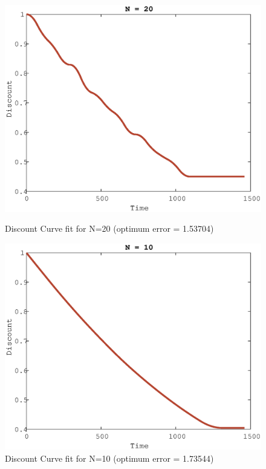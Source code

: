 \documentclass[a4paper]{article}
\begin{document}
\begin{figure}[!ht]
  \centering
  \begin{minipage}[b]{0.4\textwidth}
    \includegraphics[width=1.0\textwidth]{N20.eps}
    \caption{Discount Curve fit for N=20 (optimum error = 1.53704)}
  \end{minipage}
  \hfill
  \begin{minipage}[b]{0.4\textwidth}
    \includegraphics[width=1.0\textwidth]{N10.eps}
    \caption{Discount Curve fit for N=10 (optimum error = 1.73544)}
  \end{minipage}
\end{figure}
\end{document}
